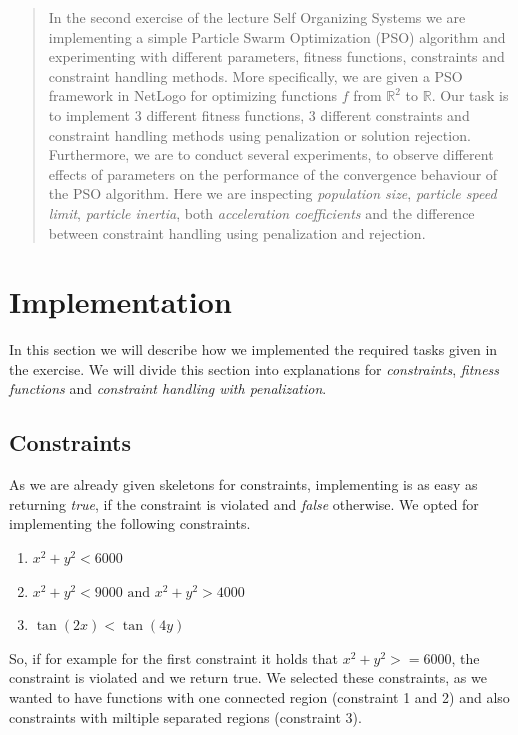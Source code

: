 \documentclass[12pt]{article}
\begin{document}
\maketitle

\begin{abstract}
    In the second exercise of the lecture Self Organizing Systems we are implementing a simple Particle Swarm Optimization (PSO) algorithm and experimenting with different parameters, fitness functions, constraints and constraint handling methods.
    More specifically, we are given a PSO framework in NetLogo for optimizing functions $f$ from $\mathbb{R}^2$ to $\mathbb{R}$.
    Our task is to implement 3 different fitness functions, 3 different constraints and constraint handling methods using penalization or solution rejection.
    Furthermore, we are to conduct several experiments, to observe different effects of parameters on the performance of the convergence behaviour of the PSO algorithm.
    Here we are inspecting \textit{population size}, \textit{particle speed limit}, \textit{particle inertia}, both \textit{acceleration coefficients} and the difference between constraint handling using penalization and rejection.
\end{abstract}

\section{Implementation}
In this section we will describe how we implemented the required tasks given in the exercise.
We will divide this section into explanations for \textit{constraints}, \textit{fitness functions} and \textit{constraint handling with penalization}.

\subsection{Constraints}
As we are already given skeletons for constraints, implementing is as easy as returning \textit{true}, if the constraint is violated and \textit{false} otherwise.
We opted for implementing the following constraints.
\begin{enumerate}
        \item $x^2+y^2<6000$
        \item $x^2+y^2<9000\text{ and }x^2+y^2>4000$
        \item $\tan(2x)<\tan(4y)$
\end{enumerate}
So, if for example for the first constraint it holds that $x^2+y^2>=6000$, the constraint is violated and we return true.
We selected these constraints, as we wanted to have functions with one connected region (constraint 1 and 2) and also constraints with miltiple separated regions (constraint 3).
\end{document}
